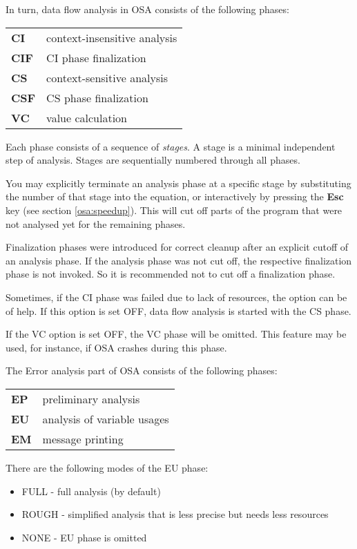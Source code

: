 In turn, data flow analysis in OSA consists of the following phases:

\begin{tabular}{ll}
\bf CI  &  context-insensitive analysis \\
\bf CIF &  CI phase finalization        \\
\bf CS  &  context-sensitive analysis   \\
\bf CSF &  CS phase finalization        \\
\bf VC  &  value calculation
\end{tabular}

Each phase consists of a sequence of {\em stages}. 
A stage is a minimal independent step of analysis.
Stages are sequentially numbered through all phases.

You may explicitly terminate an analysis phase at a specific stage
by substituting the number of that stage into the 
 equation, or interactively by
pressing the {\bf Esc} key (see section \ref{osa:speedup}). 
This will cut off parts of the program that were not analysed yet
for the remaining phases.

Finalization phases were introduced for correct cleanup after 
an explicit cutoff of an analysis phase.
If the analysis phase was not cut off, the respective finalization
phase is not invoked. So it is recommended not to cut off
a finalization phase.  

Sometimes, if the CI phase was failed due to lack of resources,
the option  can be of help. If this option is set OFF,
data flow analysis is started with the CS phase.

If the VC option is set OFF, the VC phase will be omitted.
This feature may be used, for instance, if OSA crashes during this
phase.

The Error analysis part of OSA consists of the following phases:

\begin{tabular}{ll}
\bf EP  &  preliminary analysis         \\
\bf EU  &  analysis of variable usages  \\
\bf EM  &  message printing             \\
\end{tabular}

There are the following modes of the EU phase:
\begin{itemize}
\item FULL  -  full analysis (by default)
\item ROUGH -  simplified analysis that is less precise but needs less 
               resources 
\item NONE  -  EU phase is omitted 
\end{itemize}

